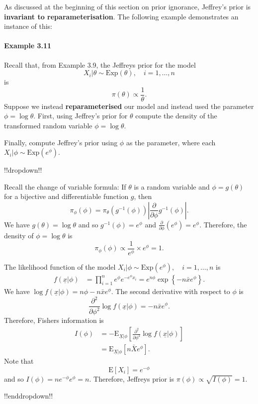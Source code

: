 \clearpage

As discussed at the beginning of this section on prior ignorance, Jeffrey's prior is \textbf{\color{darkblue}invariant to reparameterisation}. The following example demonstrates an instance of this:

\paragraph{Example 3.11}{Recall that, from Example 3.9, the Jeffreys prior for the model
    $$ X_i|\theta\sim \mathrm{Exp}(\theta), \quad i = 1,\ldots, n $$
    is
    $$ \pi(\theta) \propto \frac{1}{\theta}. $$
    Suppose we instead \textbf{\color{darkblue}reparameterised} our model and instead used the parameter $\phi = \log \theta$. First, using Jeffrey's prior for $\theta$ compute the density of the transformed random variable $\phi = \log\theta$. 
    
    Finally, compute Jeffrey's prior using $\phi$ as the parameter, where each $X_i|\phi \sim \mathrm{Exp}(e^{\phi})$.
    
    !!dropdown!!

Recall the change of variable formula:  If $\theta$ is a random variable and $\phi = g(\theta)$ for a bijective and differentiable function $g$, then
        $$ \pi_{\phi}(\phi) = \pi_{\theta}(g^{-1}(\phi))\left|\frac{\partial}{\partial \phi} g^{-1}(\phi)\right|. $$
        We have $g(\theta) = \log\theta$ and so $g^{-1}(\phi) = e^{\phi}$ and $\frac{\partial}{\partial\phi}  \left(e^{\phi}\right) = e^{\phi}.$
        Therefore, the density of $\phi = \log \theta$ is
        $$ \pi_{\phi}(\phi) \propto \frac{1}{e^{\phi}} \times e^{\phi}  = 1.$$

        The likelihood function of the model $X_i|\phi \sim \mathrm{Exp}(e^{\phi}), \quad i=1,\ldots,n$ is
         \begin{align*}
             f(\underline{x}|\phi) &= \prod_{i=1}^n e^{\phi} e^{-e^{\phi}x_i} = e^{n\phi} \exp\left\{-n\bar{x}e^{\phi}\right\}.
         \end{align*}
         We have $\log f(\underline{x}|\phi) = n\phi -  n\bar{x}e^{\phi}.$
         The second derivative with respect to $\phi$ is
         $$ \frac{\partial^2}{\partial\phi^2} \log f(\underline{x}|\phi) = - n\bar{x}e^{\phi}.$$
         Therefore, Fishers information is
        \begin{align*}
            I(\phi) &= -\text{E}_{\underline{X}|\phi}\left[\frac{\partial^2}{\partial\phi^2} \log f(\underline{x}|\phi) \right] \\
            &= \text{E}_{\underline{X}|\phi}[n\bar{X}e^{\phi}].
        \end{align*}
        Note that $$\text{E}[X_i] = e^{-\phi}$$ and so $I(\phi) = n e^{-\phi} e^{\phi} = n$. Therefore, Jeffreys prior is
        $\pi(\phi) \propto \sqrt{I(\phi)} = 1$.

!!enddropdown!!}

